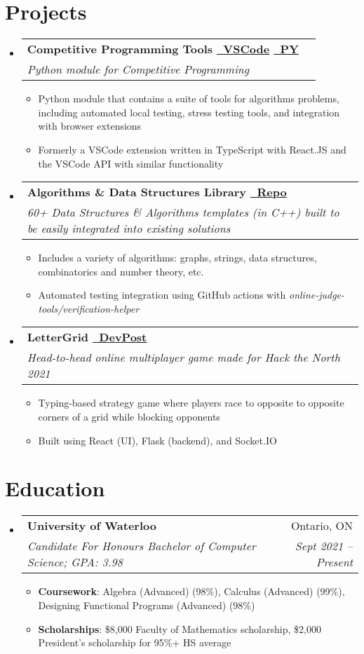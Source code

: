 \documentclass[letterpaper,11pt]{article}
\makeatletter
\newcommand{\resumeItem}[2]{
  \item\small{
    \textbf{#1}{: #2 \vspace{-2pt}}
  }
}
\newcommand{\resumeText}[1]{
  \item\small{
    \textbf{}{#1 \vspace{-2pt}}
  }
}
\newcommand{\resumeSubheading}[4]{
  \vspace{-1pt}\item
    \begin{tabular*}{0.97\textwidth}[t]{l@{\extracolsep{\fill}}r}
      \textbf{#1} & #2 \\
      \textit{\small#3} & \textit{\small #4} \\
    \end{tabular*}\vspace{-5pt}
}
\newcommand{\resumeSubHeadingListStart}{\begin{itemize}[leftmargin=*]}
\newcommand{\resumeSubHeadingListEnd}{\end{itemize}}
\newcommand{\resumeItemListStart}{\begin{itemize}}
\newcommand{\resumeItemListEnd}{\end{itemize}\vspace{-5pt}}
\newcommand{\link}[2]{\href{#1}{\color{linkblue}\underline{#2}}}
\makeatother
\begin{document}
\section{Projects}
  \resumeSubHeadingListStart
    \resumeSubheading{Competitive Programming Tools \link{https://github.com/plasmatic1/competitive-programming-tools}{\faGithub\ VSCode} \link{https://github.com/plasmatic1/cp-tools-console}{\faGithub\ PY}}{}
      {Python module for Competitive Programming}{}
      \resumeItemListStart
        \resumeText{Python module that contains a suite of tools for algorithms problems, including automated local testing, stress testing tools, and integration with browser extensions}
        \resumeText{Formerly a VSCode extension written in TypeScript with React.JS and the VSCode API with similar functionality}
      \resumeItemListEnd
    \resumeSubheading{Algorithms \& Data Structures Library \link{https://github.com/plasmatic1/templates}{\faGithub\ Repo}}{}
      {60+ Data Structures \& Algorithms templates (in C++) built to be easily integrated into existing solutions}{}
      \resumeItemListStart
        \resumeText{Includes a variety of algorithms: graphs, strings, data structures, combinatorics and number theory, etc.}{}
        \resumeText{Automated testing integration using GitHub actions with \textit{online-judge-tools/verification-helper}}
      \resumeItemListEnd
    \resumeSubheading{LetterGrid \link{https://devpost.com/software/typecycles}{\faLink\ DevPost}}{}
      {Head-to-head online multiplayer game made for Hack the North 2021}{}
      \resumeItemListStart
        \resumeText{Typing-based strategy game where players race to opposite to opposite corners of a grid while blocking opponents}
        \resumeText{Built using React (UI), Flask (backend), and Socket.IO}
      \resumeItemListEnd
  \resumeSubHeadingListEnd

\section{Education}
  \resumeSubHeadingListStart
    \resumeSubheading
      {University of Waterloo}{Ontario, ON}
      {Candidate For Honours Bachelor of Computer Science;  GPA: 3.98}{Sept 2021 -- Present}
      \resumeItemListStart
        \resumeItem{Coursework}
          {Algebra (Advanced) (98\%), Calculus (Advanced) (99\%), Designing Functional Programs (Advanced) (98\%)}
        \resumeItem{Scholarships}
          {\$8,000 Faculty of Mathematics scholarship, \$2,000 President's scholarship for 95\%+ HS average}
      \resumeItemListEnd
  \resumeSubHeadingListEnd

\end{document}
